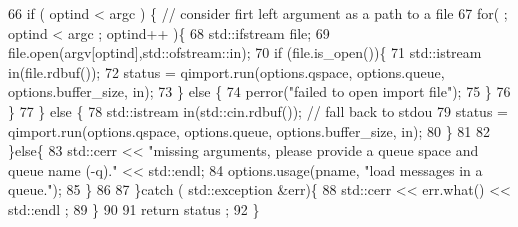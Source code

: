\begin{DoxyCodeInclude}
66       if ( optind < argc ) \{ // consider firt left argument as a path to a file
67         for( ; optind < argc ; optind++ )\{
68           std::ifstream file;
69           file.open(argv[optind],std::ofstream::in);
70           if (file.is\_open())\{
71             std::istream in(file.rdbuf());
72             status = qimport.run(options.qspace, options.queue, options.buffer\_size, in);
73           \} else \{
74             perror("failed to open import file");
75           \}
76         \}
77       \} else \{
78         std::istream in(std::cin.rdbuf()); // fall back to stdou
79         status = qimport.run(options.qspace, options.queue, options.buffer\_size, in);
80       \}
81 
82     \}else\{
83       std::cerr << "missing arguments, please provide a queue space and queue name (-q)." << std::endl;
84       options.usage(pname, "load messages in a queue.");
85     \}
86 
87   \}catch ( std::exception &err)\{
88     std::cerr << err.what() << std::endl ;
89   \}
90 
91   return status ;
92 \}
\end{DoxyCodeInclude}
 